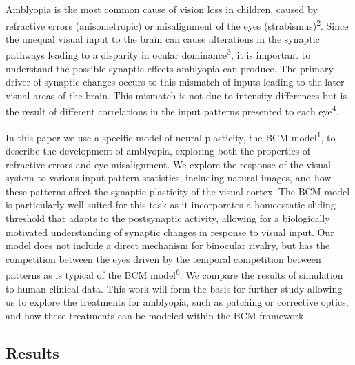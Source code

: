 \documentclass[
]{article}
\begin{document}
Amblyopia is the most common cause of vision loss in children, caused by
refractive errors (anisometropic) or misalignment of the eyes
(strabismus)\textsuperscript{2}. Since the unequal visual input to the
brain can cause alterations in the synaptic pathways leading to a
disparity in ocular dominance\textsuperscript{3}, it is important to
understand the possible synaptic effects amblyopia can produce. The
primary driver of synaptic changes occurs to this mismatch of inputs
leading to the later visual areas of the brain. This mismatch is not due
to intensity differences but is the result of different correlations in
the input patterns presented to each eye\textsuperscript{4}.

In this paper we use a specific model of neural plasticity, the BCM
model\textsuperscript{1}, to describe the development of amblyopia,
exploring both the properties of refractive errors and eye misalignment.
We explore the response of the visual system to various input pattern
statistics, including natural images, and how these patterns affect the
synaptic plasticity of the visual cortex. The BCM model is particularly
well-suited for this task as it incorporates a homeostatic sliding
threshold that adapts to the postsynaptic activity, allowing for a
biologically motivated understanding of synaptic changes in response to
visual input. Our model does not include a direct mechanism for
binocular rivalry, but has the competition between the eyes driven by
the temporal competition between patterns as is typical of the BCM
model\textsuperscript{6}. We compare the results of simulation to human
clinical data. This work will form the basis for further study allowing
us to explore the treatments for amblyopia, such as patching or
corrective optics, and how these treatments can be modeled within the
BCM framework.

\subsection{Results}\label{sec:results}
\end{document}
